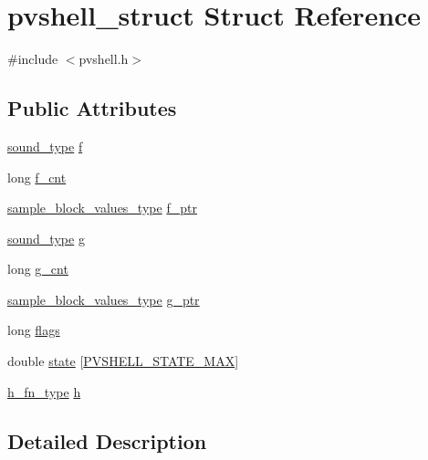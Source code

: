\hypertarget{structpvshell__struct}{}\section{pvshell\+\_\+struct Struct Reference}
\label{structpvshell__struct}


{\ttfamily \#include $<$pvshell.\+h$>$}

\subsection*{Public Attributes}
\begin{DoxyCompactItemize}
\item 
\hyperlink{sound_8h_a792cec4ed9d6d636d342d9365ba265ea}{sound\+\_\+type} \hyperlink{structpvshell__struct_a5af3be8603e108a163e017a1cf5a7d7f}{f}
\item 
long \hyperlink{structpvshell__struct_a07873e37cb14ce9e4d14cef2e2e78897}{f\+\_\+cnt}
\item 
\hyperlink{sound_8h_a83d17f7b465d1591f27cd28fc5eb8a03}{sample\+\_\+block\+\_\+values\+\_\+type} \hyperlink{structpvshell__struct_af12d5a7427471dd6b17c57a0531f038c}{f\+\_\+ptr}
\item 
\hyperlink{sound_8h_a792cec4ed9d6d636d342d9365ba265ea}{sound\+\_\+type} \hyperlink{structpvshell__struct_a9d9b8958ca305d3038b5ac9878e13707}{g}
\item 
long \hyperlink{structpvshell__struct_a04a10cd96eb9d74618eee306689a7721}{g\+\_\+cnt}
\item 
\hyperlink{sound_8h_a83d17f7b465d1591f27cd28fc5eb8a03}{sample\+\_\+block\+\_\+values\+\_\+type} \hyperlink{structpvshell__struct_a354dd94621d1cb0d45b20f59f9fe712b}{g\+\_\+ptr}
\item 
long \hyperlink{structpvshell__struct_ad3e2e526c433ea8cc6ba1e500ece9020}{flags}
\item 
double \hyperlink{structpvshell__struct_afc01b285127c630e7edd2772104baa3e}{state} \mbox{[}\hyperlink{pvshell_8h_a86a0a2d0a2ffe84fdbd39d7090e08096}{P\+V\+S\+H\+E\+L\+L\+\_\+\+S\+T\+A\+T\+E\+\_\+\+M\+AX}\mbox{]}
\item 
\hyperlink{pvshell_8h_a848f4f236adfdce731002b4ec48a883f}{h\+\_\+fn\+\_\+type} \hyperlink{structpvshell__struct_a7c4363e3b607eec2630a9ffd3dd276a3}{h}
\end{DoxyCompactItemize}


\subsection{Detailed Description}


